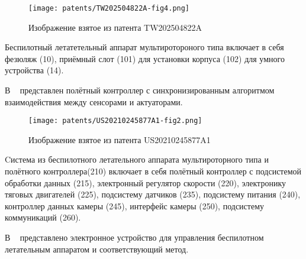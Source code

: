 \begin{figure}[H]
  \centering
  \texttt{[image: patents/TW202504822A-fig4.png]}
  \caption{Изображение взятое из патента TW202504822A}
\end{figure}


Беспилотный летатетельный аппарат мультиротороного типа включает в
себя фезюляж (10), приёмный слот (101) для установки корпуса (102) для
умного устройства (14).

В ~\cite{US20210245877A1} представлен полётный контроллер с
синхронизированным алгоритмом взаимодействия между сенсорами и
актуаторами.

\begin{figure}[H]
  \centering
  \texttt{[image: patents/US20210245877A1-fig2.png]}
  \caption{Изображение взятое из патента US20210245877A1}
\end{figure}

Cистема из беспилотного летательного аппарата мультироторного типа и
полётного контроллера(210) включает в себя полётный контроллер с
подсистемой обработки данных (215), электронный регулятор скорости
(220), электронику тяговых двигателей (225), подсистему датчиков
(235), подсистему питания (240), контроллер данных камеры (245),
интерфейс камеры (250), подсистему коммуникаций (260).

В ~\cite{US10551834B2} представлено электронное устройство для
управления беспилотном летательным аппаратом и соответствующий метод.


\newpage
